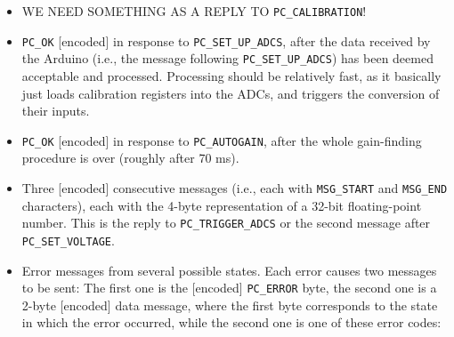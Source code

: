 \documentclass[11pt,a4paper,english]{article}
\begin{document}
\begin{itemize}
\item WE NEED SOMETHING AS A REPLY TO \texttt{PC\_CALIBRATION}! 
\item \texttt{PC\_OK} [encoded] in response to \texttt{PC\_SET\_UP\_ADCS}, after the data received by the Arduino (i.e., the message following \texttt{PC\_SET\_UP\_ADCS}) has been deemed acceptable and processed. Processing should be relatively fast, as it basically just loads calibration registers into the ADCs, and triggers the conversion of their inputs.
\item \texttt{PC\_OK} [encoded] in response to \texttt{PC\_AUTOGAIN}, after the whole gain-finding procedure is over (roughly after 70 ms).
\item Three [encoded] consecutive messages (i.e., each with \texttt{MSG\_START} and \texttt{MSG\_END} characters), each with the 4-byte representation of a 32-bit floating-point number. This is the reply to \texttt{PC\_TRIGGER\_ADCS} or the second message after \texttt{PC\_SET\_VOLTAGE}.
\item Error messages from several possible states. Each error causes two messages to be sent: The first one is the [encoded] \texttt{PC\_ERROR} byte, the second one is a 2-byte [encoded] data message, where the first byte corresponds to the state in which the error occurred, while the second one is one of these error codes:


\end{itemize}
\end{document}
